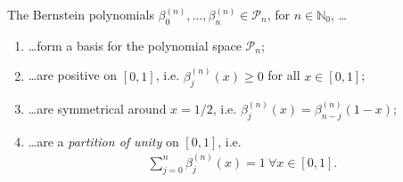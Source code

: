 \begin{remark}\label{remark:properties_Bernstein_polynomials}
	The Bernstein polynomials $\beta_{0}^{(n)}, \dots, \beta_{n}^{(n)}\in\mathcal P_n$, for $n\in\mathbb N_{0}$, \dots 
	\begin{enumerate}[label=(\alph*)]
		\item \dots form a basis for the polynomial space $\mathcal P_n$;
		\item \dots are positive on $[0, 1]$, i.e. $\beta_{j}^{(n)}(x) \geq 0$ for all $x\in[0, 1]$;
		\item \dots are symmetrical around $x = 1/2$, i.e. $\beta_{j}^{(n)}(x) = \beta_{n-j}^{(n)}(1 - x)$;
		\item \dots are a \textit{partition of unity} on $[0, 1]$, i.e. 
		\begin{align}
			\sum_{j=0}^{n}\beta_j^{(n)}(x) = 1 \ \forall x\in [0, 1].
		\end{align} 
	\end{enumerate}
\end{remark}

